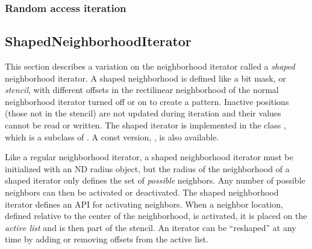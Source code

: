 {\subsubsection{Random access iteration}
\label{sec:NeighborhoodExample6}




\subsection{ShapedNeighborhoodIterator}
\label{sec:itkShapedNeighborhoodIterator}
This section describes a variation on the neighborhood iterator called a
\emph{shaped} neighborhood iterator.  A shaped neighborhood is defined like
a bit mask, or \emph{stencil}, with different offsets in the rectilinear
neighborhood of the normal neighborhood iterator turned off or on to create a
pattern.  Inactive positions (those not in the stencil) are not updated during
iteration and their values cannot be read or written.  The shaped iterator is
implemented in the class , which is a
subclass of
.  A const version,
, is also available.

Like a regular neighborhood iterator, a shaped neighborhood iterator must be
initialized with an ND radius object, but the radius of the neighborhood of a
shaped iterator only defines the set of \emph{possible} neighbors.  Any number
of possible neighbors can then be activated or deactivated.  The shaped
neighborhood iterator defines an API for activating neighbors.  When a neighbor
location, defined relative to the center of the neighborhood, is activated, it
is placed on the \emph{active list} and is then part of the stencil.  An
iterator can be ``reshaped'' at any time by adding or removing offsets from the
active list.

}

